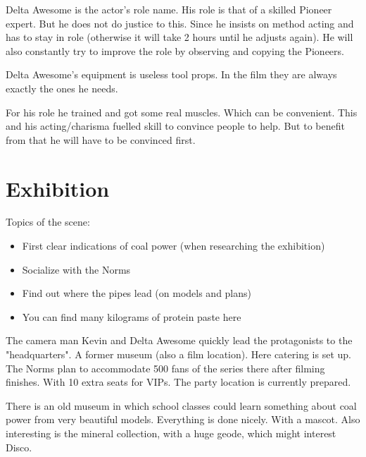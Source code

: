 \begin{npcBox}[title=Delta Awesome - acting the victim]
    \begin{consequences}
    \item {}
    \item {}
    \item {}
    \end{consequences}
    
    \begin{npcDescription}
    Delta Awesome is the actor's role name. His role is that of a skilled Pioneer expert. But he does not do justice to this. Since he insists on method acting and has to stay in role (otherwise it will take 2 hours until he adjusts again). He will also constantly try to improve the role by observing and copying the Pioneers.
    
    Delta Awesome's equipment is useless tool props. In the film they are always exactly the ones he needs. 

    For his role he trained and got some real muscles. Which can be convenient. This and his acting/charisma fuelled skill to convince people to help. But to benefit from that he will have to be convinced first.
    \end{npcDescription}
    
\end{npcBox}


\section{Exhibition}

Topics of the scene:
\begin{itemize}
\item First clear indications of coal power (when researching the exhibition)
\item Socialize with the Norms
\item Find out where the pipes lead (on models and plans)
\item You can find many kilograms of protein paste here
\end{itemize}


The camera man Kevin and Delta Awesome quickly lead the protagonists to the "headquarters". A former museum (also a film location). Here catering is set up. The Norms plan to accommodate 500 fans of the series there after filming finishes. With 10 extra seats for VIPs. The party location is currently prepared.

There is an old museum in which school classes could learn something about coal power from very beautiful models.
Everything is done nicely. With a mascot. Also interesting is the mineral collection, with a huge geode, which might interest Disco.


